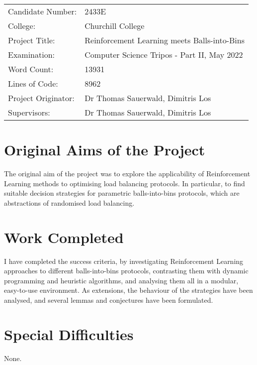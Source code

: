 
\begin{proforma}      


\begin{table}[h]
\begin{tabular}{ll}
Candidate Number:  & 2433E \\
College: & Churchill College \\
Project Title:    &  Reinforcement Learning meets Balls-into-Bins  \\
Examination:  & Computer Science Tripos - Part II, May 2022   \\
Word Count:  & 13931  \protect\footnotemark[1]\\
Lines of Code: & 8962 \protect\footnotemark[2] \\
Project Originator: & Dr Thomas Sauerwald, Dimitris Los \\
Supervisors: & Dr Thomas Sauerwald, Dimitris Los 
\end{tabular}
\end{table}




\section*{Original Aims of the Project}

The original aim of the project was to explore the applicability of Reinforcement Learning methods to optimising load balancing protocols. In particular, to find suitable decision strategies for parametric balls-into-bins protocols, which are abstractions of randomised load balancing.

\section*{Work Completed}

I have completed the success criteria, by investigating Reinforcement Learning approaches to different balls-into-bins protocols, contrasting them with dynamic programming and heuristic algorithms, and analysing them all in a modular, easy-to-use environment. As extensions, the behaviour of the strategies have been analysed, and several lemmas and conjectures have been formulated.

\section*{Special Difficulties}

None.

\end{proforma}

